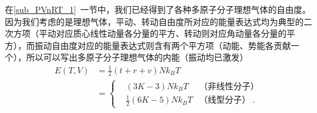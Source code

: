 在\autoref{sub_PVnRT_1}~一节中，我们已经得到了各种多原子分子理想气体的自由度。因为我们考虑的是理想气体，平动、转动自由度所对应的能量表达式均为典型的二次方项（平动对应质心线性动量各分量的平方、转动则对应角动量各分量的平方），而振动自由度对应的能量表达式则含有两个平方项（动能、势能各贡献一个），所以可以写出多原子分子理想气体的内能（振动均已激发）
\begin{equation}
\begin{aligned}
E(T, V) &= \frac 12 (t+r+v)Nk_B T \\
&= \left\{\begin{aligned}
&(3K-3)Nk_BT &\text{（非线性分子）}\\
&\frac12(6K-5)Nk_BT&\text{（线型分子）} ~.
\end{aligned}\right.
\end{aligned}
\end{equation}

